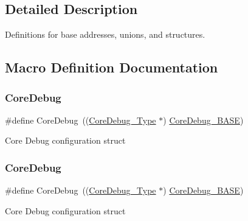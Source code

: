 \subsection{Detailed Description}
Definitions for base addresses, unions, and structures. 



\subsection{Macro Definition Documentation}
\mbox{\label{group___c_m_s_i_s__core__base_gab6e30a2b802d9021619dbb0be7f5d63d}} 
\subsubsection{\texorpdfstring{Core\+Debug}{CoreDebug}\hspace{0.1cm}{\footnotesize\ttfamily [1/4]}}
{\footnotesize\ttfamily \#define Core\+Debug~((\hyperlink{struct_core_debug___type}{Core\+Debug\+\_\+\+Type} $\ast$)     \hyperlink{group___c_m_s_i_s__core__base_ga680604dbcda9e9b31a1639fcffe5230b}{Core\+Debug\+\_\+\+B\+A\+SE})}

Core Debug configuration struct \mbox{\label{group___c_m_s_i_s__core__base_gab6e30a2b802d9021619dbb0be7f5d63d}} 
\subsubsection{\texorpdfstring{Core\+Debug}{CoreDebug}\hspace{0.1cm}{\footnotesize\ttfamily [2/4]}}
{\footnotesize\ttfamily \#define Core\+Debug~((\hyperlink{struct_core_debug___type}{Core\+Debug\+\_\+\+Type} $\ast$)     \hyperlink{group___c_m_s_i_s__core__base_ga680604dbcda9e9b31a1639fcffe5230b}{Core\+Debug\+\_\+\+B\+A\+SE})}

Core Debug configuration struct \mbox{\label{group___c_m_s_i_s__core__base_gab6e30a2b802d9021619dbb0be7f5d63d}} 

